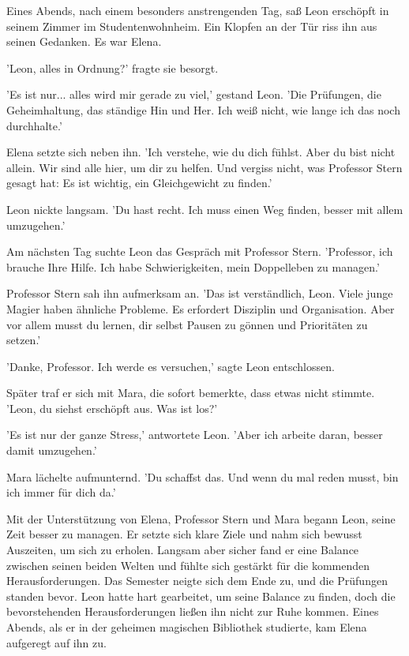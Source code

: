\documentclass[12pt]{article}
\begin{document}
Eines Abends, nach einem besonders anstrengenden Tag, saß Leon erschöpft in seinem Zimmer im Studentenwohnheim. Ein Klopfen an der Tür riss ihn aus seinen Gedanken. Es war Elena.

'Leon, alles in Ordnung?' fragte sie besorgt.

'Es ist nur... alles wird mir gerade zu viel,' gestand Leon. 'Die Prüfungen, die Geheimhaltung, das ständige Hin und Her. Ich weiß nicht, wie lange ich das noch durchhalte.'

Elena setzte sich neben ihn. 'Ich verstehe, wie du dich fühlst. Aber du bist nicht allein. Wir sind alle hier, um dir zu helfen. Und vergiss nicht, was Professor Stern gesagt hat: Es ist wichtig, ein Gleichgewicht zu finden.'

Leon nickte langsam. 'Du hast recht. Ich muss einen Weg finden, besser mit allem umzugehen.'

Am nächsten Tag suchte Leon das Gespräch mit Professor Stern. 'Professor, ich brauche Ihre Hilfe. Ich habe Schwierigkeiten, mein Doppelleben zu managen.'

Professor Stern sah ihn aufmerksam an. 'Das ist verständlich, Leon. Viele junge Magier haben ähnliche Probleme. Es erfordert Disziplin und Organisation. Aber vor allem musst du lernen, dir selbst Pausen zu gönnen und Prioritäten zu setzen.'

'Danke, Professor. Ich werde es versuchen,' sagte Leon entschlossen.

Später traf er sich mit Mara, die sofort bemerkte, dass etwas nicht stimmte. 'Leon, du siehst erschöpft aus. Was ist los?'

'Es ist nur der ganze Stress,' antwortete Leon. 'Aber ich arbeite daran, besser damit umzugehen.'

Mara lächelte aufmunternd. 'Du schaffst das. Und wenn du mal reden musst, bin ich immer für dich da.'

Mit der Unterstützung von Elena, Professor Stern und Mara begann Leon, seine Zeit besser zu managen. Er setzte sich klare Ziele und nahm sich bewusst Auszeiten, um sich zu erholen. Langsam aber sicher fand er eine Balance zwischen seinen beiden Welten und fühlte sich gestärkt für die kommenden Herausforderungen. Das Semester neigte sich dem Ende zu, und die Prüfungen standen bevor. Leon hatte hart gearbeitet, um seine Balance zu finden, doch die bevorstehenden Herausforderungen ließen ihn nicht zur Ruhe kommen. Eines Abends, als er in der geheimen magischen Bibliothek studierte, kam Elena aufgeregt auf ihn zu.
\end{document}
